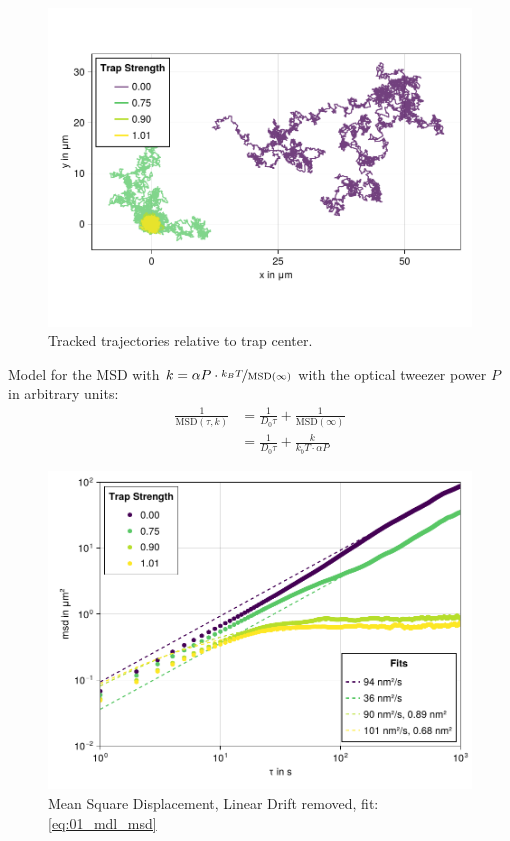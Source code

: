 \documentclass[
    parskip=half, 
    twoside=false,
    twocolumn=true,
    fontsize=11pt,
]{scrarticle}
\begin{document}
\begin{figure}[h]
    \centering
    \includegraphics{figures/01_02_1_trajectories.pdf}
    \caption{Tracked trajectories relative to trap center.}
\end{figure}

Model for the MSD with $k=\alpha P \cdot\nicefrac{k_B T}{\text{MSD}(\infty)}$ with the optical tweezer power $P$ in arbitrary units:
\begin{align}
    \frac{1}{\text{MSD}(\tau, k)}
    &= \frac{1}{D_0 \tau} + \frac{1}{\text{MSD}(\infty)}\\
    &= \frac{1}{D_0 \tau} + \frac{k}{k_b T \cdot \alpha P}
    \label{eq:01_mdl_msd} 
\end{align}
\begin{figure}[h]
    \centering
    \includegraphics{figures/01_02_2_msd.pdf}
    \caption{Mean Square Displacement, Linear Drift removed, fit: \autoref{eq:01_mdl_msd}}
\end{figure}
\end{document}
